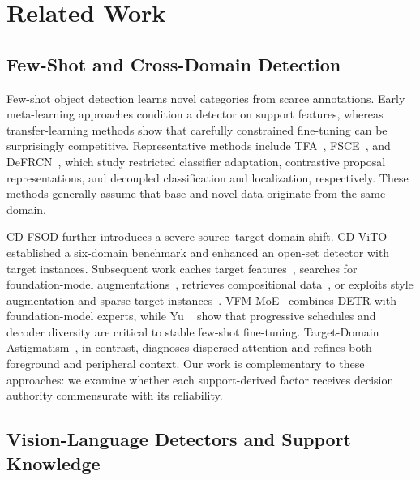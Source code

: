 \section{Related Work}
\label{sec:related}

\subsection{Few-Shot and Cross-Domain Detection}

Few-shot object detection learns novel categories from scarce annotations. Early meta-learning approaches condition a detector on support features, whereas transfer-learning methods show that carefully constrained fine-tuning can be surprisingly competitive. Representative methods include TFA~\cite{tfa}, FSCE~\cite{fsce}, and DeFRCN~\cite{defrcn}, which study restricted classifier adaptation, contrastive proposal representations, and decoupled classification and localization, respectively. These methods generally assume that base and novel data originate from the same domain.

CD-FSOD further introduces a severe source--target domain shift. CD-ViTO~\cite{cdvito} established a six-domain benchmark and enhanced an open-set detector with target instances. Subsequent work caches target features~\cite{ifc}, searches for foundation-model augmentations~\cite{ets}, retrieves compositional data~\cite{domainrag}, or exploits style augmentation and sparse target instances~\cite{styleproto,sivito}. VFM-MoE~\cite{vfmmoe} combines DETR with foundation-model experts, while Yu \etal~\cite{yu2026} show that progressive schedules and decoder diversity are critical to stable few-shot fine-tuning. Target-Domain Astigmatism~\cite{astigmatism}, in contrast, diagnoses dispersed attention and refines both foreground and peripheral context. Our work is complementary to these approaches: we examine whether each support-derived factor receives decision authority commensurate with its reliability.

\subsection{Vision-Language Detectors and Support Knowledge}


